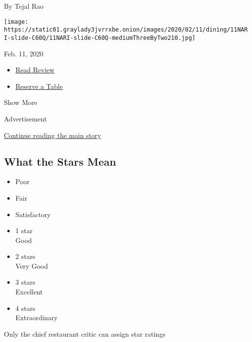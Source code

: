 \begin{enumerate}
  By Tejal Rao

  \texttt{[image: https://static01.graylady3jvrrxbe.onion/images/2020/02/11/dining/11NARI-slide-C60Q/11NARI-slide-C60Q-mediumThreeByTwo210.jpg]}

  Feb. 11, 2020

  \begin{itemize}
  \tightlist
  \item
    \href{https://www.nytimes3xbfgragh.onion/2020/02/11/dining/nari-review-tejal-rao.html?rref=collection\%2Fcollection\%2Frestaurant-guide}{Read
    Review}
  \item
    \href{https://resy.com/cities/sf/nari?utm_source=nyt\&utm_medium=restoprofile\&utm_campaign=affiliates\&aff_id=c1fe784}{Reserve
    a Table}
  \end{itemize}
\end{enumerate}

Show More

Advertisement

\protect\hyperlink{after-mid1}{Continue reading the main story}

\hypertarget{what-the-stars-mean}{%
\subsection{What the Stars Mean}\label{what-the-stars-mean}}

\begin{itemize}
\tightlist
\item
  Poor\\
  \hspace*{0.333em}
\item
  Fair\\
  \hspace*{0.333em}
\item
  Satisfactory\\
  \hspace*{0.333em}
\item
  1 star\\
  Good
\item
  2 stars\\
  Very Good
\item
  3 stars\\
  Excellent
\item
  4 stars\\
  Extraordinary
\end{itemize}

Only the chief restaurant critic can assign star ratings

